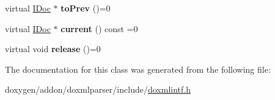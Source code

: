 \begin{DoxyCompactItemize}
\item 
\mbox{\label{class_i_doc_iterator_a4132ed88a702854345611b79b9a23eee}} 
virtual \mbox{\hyperlink{class_i_doc}{I\+Doc}} $\ast$ {\bfseries to\+Prev} ()=0
\item 
\mbox{\label{class_i_doc_iterator_ace3bcef00bcf5d5d641b69018ddb9a18}} 
virtual \mbox{\hyperlink{class_i_doc}{I\+Doc}} $\ast$ {\bfseries current} () const =0
\item 
\mbox{\label{class_i_doc_iterator_a0876d4fe51d8dc795764951ff6eee220}} 
virtual void {\bfseries release} ()=0
\end{DoxyCompactItemize}


The documentation for this class was generated from the following file\+:\begin{DoxyCompactItemize}
\item 
doxygen/addon/doxmlparser/include/\mbox{\hyperlink{include_2doxmlintf_8h}{doxmlintf.\+h}}\end{DoxyCompactItemize}
